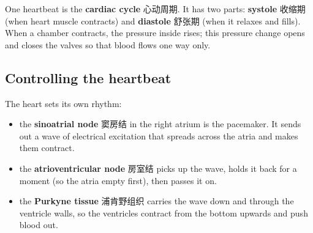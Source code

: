 \documentclass[11pt]{article}
\begin{document}
One heartbeat is the \textbf{cardiac cycle} 心动周期. It has two parts: \textbf{systole} 收缩期 (when heart muscle contracts) and \textbf{diastole} 舒张期 (when it relaxes and fills). When a chamber contracts, the pressure inside rises; this pressure change opens and closes the valves so that blood flows one way only.

\subsection*{Controlling the heartbeat}

The heart sets its own rhythm:

\begin{itemize}
\item the \textbf{sinoatrial node} 窦房结 in the right atrium is the pacemaker. It sends out a wave of electrical excitation that spreads across the atria and makes them contract.

\item the \textbf{atrioventricular node} 房室结 picks up the wave, holds it back for a moment (so the atria empty first), then passes it on.

\item the \textbf{Purkyne tissue} 浦肯野组织 carries the wave down and through the ventricle walls, so the ventricles contract from the bottom upwards and push blood out.

\end{itemize}
\end{document}
